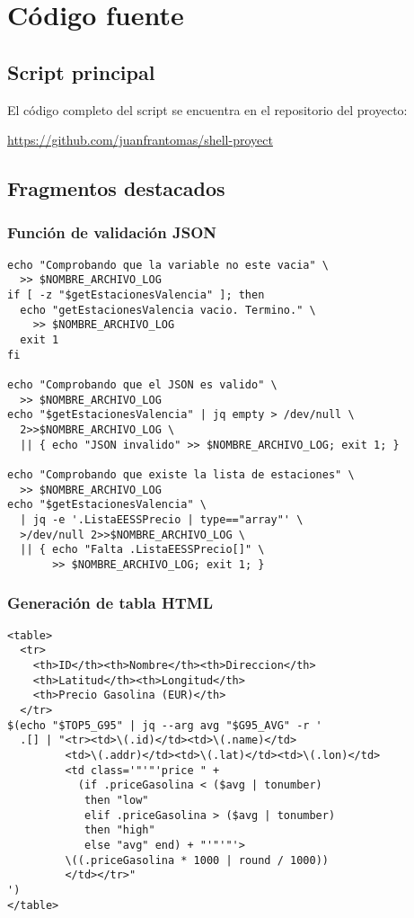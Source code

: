 \chapter{Código fuente}

\section{Script principal}

El código completo del script  se encuentra en el repositorio del proyecto:

\url{https://github.com/juanfrantomas/shell-proyect}

\section{Fragmentos destacados}

\subsection{Función de validación JSON}

\begin{lstlisting}[style=bash,caption={Validación de estructura JSON}]
echo "Comprobando que la variable no este vacia" \
  >> $NOMBRE_ARCHIVO_LOG
if [ -z "$getEstacionesValencia" ]; then
  echo "getEstacionesValencia vacio. Termino." \
    >> $NOMBRE_ARCHIVO_LOG
  exit 1
fi

echo "Comprobando que el JSON es valido" \
  >> $NOMBRE_ARCHIVO_LOG
echo "$getEstacionesValencia" | jq empty > /dev/null \
  2>>$NOMBRE_ARCHIVO_LOG \
  || { echo "JSON invalido" >> $NOMBRE_ARCHIVO_LOG; exit 1; }

echo "Comprobando que existe la lista de estaciones" \
  >> $NOMBRE_ARCHIVO_LOG
echo "$getEstacionesValencia" \
  | jq -e '.ListaEESSPrecio | type=="array"' \
  >/dev/null 2>>$NOMBRE_ARCHIVO_LOG \
  || { echo "Falta .ListaEESSPrecio[]" \
       >> $NOMBRE_ARCHIVO_LOG; exit 1; }
\end{lstlisting}

\subsection{Generación de tabla HTML}

\begin{lstlisting}[style=bash,caption={Tabla HTML dinámica con colores}]
<table>
  <tr>
    <th>ID</th><th>Nombre</th><th>Direccion</th>
    <th>Latitud</th><th>Longitud</th>
    <th>Precio Gasolina (EUR)</th>
  </tr>
$(echo "$TOP5_G95" | jq --arg avg "$G95_AVG" -r '
  .[] | "<tr><td>\(.id)</td><td>\(.name)</td>
         <td>\(.addr)</td><td>\(.lat)</td><td>\(.lon)</td>
         <td class='"'"'price " + 
           (if .priceGasolina < ($avg | tonumber) 
            then "low" 
            elif .priceGasolina > ($avg | tonumber) 
            then "high" 
            else "avg" end) + "'"'"'>
         \((.priceGasolina * 1000 | round / 1000))
         </td></tr>"
')
</table>
\end{lstlisting}

